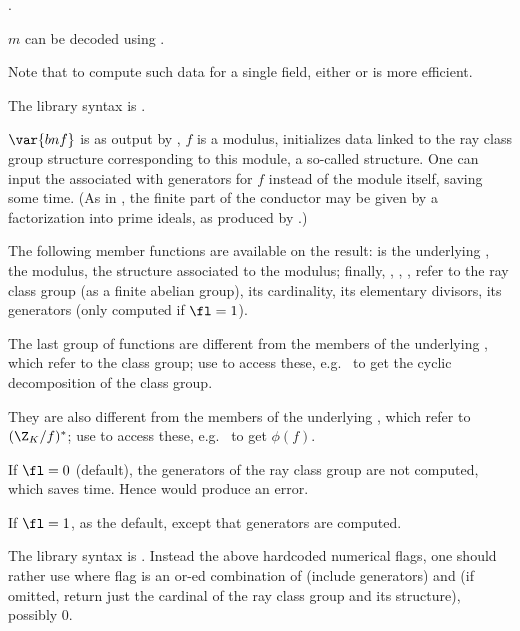 .

\noindent $m$ can be decoded using .

Note that to compute such data for a single field, either 
or  is more efficient.

The library syntax is .

\label{se:bnrinit}
$\var{bnf}$ is as
output by , $f$ is a modulus, initializes data linked to
the ray class group structure corresponding to this module, a so-called
 structure. One can input the associated  with generators
for $f$ instead of the module itself, saving some time.
(As in , the finite part of the conductor may be given
by a factorization into prime ideals, as produced by .)

The following member functions are available
on the result:  is the underlying ,
 the modulus,  the  structure associated to the
modulus; finally, , , ,  refer to the
ray class group (as a finite abelian group), its cardinality, its elementary
divisors, its generators (only computed if $\fl = 1$).

The last group of functions are different from the members of the underlying
, which refer to the class group; use 
to access these, e.g.~ to get the cyclic decomposition
of the class group.

They are also different from the members of the underlying , which
refer to $(\Z_K/f)^*$; use  to access these,
e.g.~ to get $\phi(f)$.

If $\fl=0$ (default), the generators of the ray class group are not computed,
which saves time. Hence  would produce an error.

If $\fl=1$, as the default, except that generators are computed.

The library syntax is .
Instead the above  hardcoded  numerical flags,  one should rather use
where flag is an or-ed combination of  (include generators)
and  (if omitted, return just the cardinal of the ray class group
and its structure), possibly 0.

